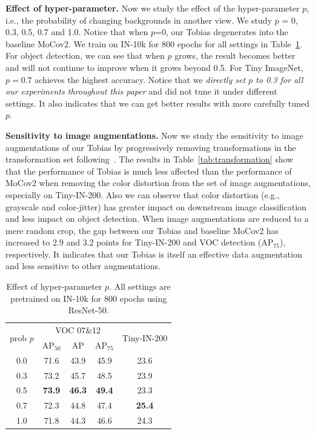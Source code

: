 \documentclass[letterpaper]{article}
\begin{document}
\textbf{Effect of hyper-parameter.} Now we study the effect of the hyper-parameter $p$, i.e., the probability of changing backgrounds in another view. We study $p$ = 0, 0.3, 0.5, 0.7 and 1.0. Notice that when $p$=0, our Tobias degenerates into the baseline MoCov2. We train on IN-10k for 800 epochs for all settings in Table~\ref{tab:hyperparameter}. For object detection, we can see that when $p$ grows, the result becomes better and will not continue to improve when it grows beyond 0.5. For Tiny ImageNet, $p=0.7$ achieves the highest accuracy. Notice that we \emph{directly set $p$ to 0.3 for all our experiments throughout this paper} and did not tune it under different settings. It also indicates that we can get better results with more carefully tuned $p$.



\textbf{Sensitivity to image augmentations.} Now we study the sensitivity to image augmentations of our Tobias by progressively removing transformations in the transformation set following~\citet{byol:grill:NIPS20}. The results in Table~\ref{tab:transformation} show that the performance of Tobias is much less affected than the performance of MoCov2 when removing the color distortion from the set of image augmentations, especially on Tiny-IN-200. Also we can observe that color distortion (e.g., grayscale and color-jitter) has greater impact on downstream image classification and less impact on object detection. When image augmentations are reduced to a mere random crop, the gap between our Tobias and baseline MoCov2 has increased to 2.9 and 3.2 points for Tiny-IN-200 and VOC detection ($\text{AP}_{75}$), respectively. It indicates that our Tobias is itself an effective data augmentation and less sensitive to other augmentations.

\begin{table}
	\caption{Effect of hyper-parameter $p$. All settings are pretrained on IN-10k for 800 epochs using ResNet-50.}
	\label{tab:hyperparameter}
	\centering
	\small
	\renewcommand{\arraystretch}{0.9}
	\renewcommand{\multirowsetup}{\centering}
	\begin{adjustbox}{width=0.3\columnwidth}
\begin{tabular}{c|ccc|c}
		\hline
		\multirow{2}{*}{prob $p$}         &           \multicolumn{3}{c|}{VOC 07\&12}    &\multirow{2}{*}{Tiny-IN-200}         \\
		\cline{2-4}
		& $\text{AP}_{50}$ & $\text{AP}$ & $\text{AP}_{75}$ &\\
		\hline
		0.0	 &     71.6      &  43.9       &  45.9      &  23.6    \\
		0.3	 &     73.2     &  45.7       &  48.5      &  23.9    \\
		0.5	 &     \textbf{73.9}     &  \textbf{46.3}       &  \textbf{49.4}      &  23.3    \\
		0.7	 &     72.3     &  44.8       &  47.4      &  \textbf{25.4}    \\
		1.0 &       71.8      & 44.3&46.6&24.3\\
		\hline
	\end{tabular}
\end{adjustbox}
\end{table}
\end{document}
